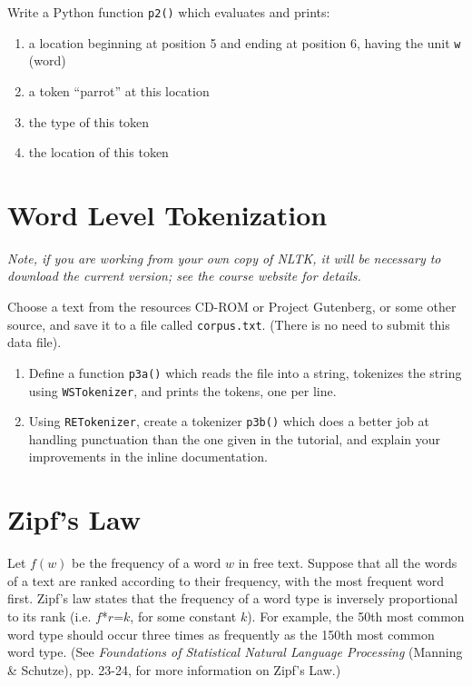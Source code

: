 \documentclass{cis530}
\begin{document}
Write a Python function \texttt{p2()} which evaluates and prints:

\begin{enumerate}
    \item a location beginning at position 5 and ending at position 6,
      having the unit \texttt{w} (word)
    \item a token ``parrot'' at this location
    \item the type of this token
    \item the location of this token
\end{enumerate}

\section{Word Level Tokenization}

\textit{Note, if you are working from your own copy of NLTK, it will be
  necessary to download the current version; see the course website for
  details.}

Choose a text from the resources CD-ROM or Project Gutenberg, or some other
source, and save it to a file called \texttt{corpus.txt}.  (There is no need
to submit this data file).

\begin{enumerate}
    \item Define a function \texttt{p3a()} which reads the file into a
      string, tokenizes the string using \texttt{WSTokenizer},
      and prints the tokens, one per line.
    \item Using \texttt{RETokenizer}, create a tokenizer \texttt{p3b()}
      which does a better
      job at handling punctuation than the one given in the tutorial, and
      explain your improvements in the inline documentation.
\end{enumerate}

\section{Zipf's Law}

Let $f(w)$ be the frequency of a word $w$ in free text.  Suppose that
all the words of a text are ranked according to their frequency, with
the most frequent word first.
Zipf's law states that the frequency of a word type is inversely
proportional to its rank (i.e. $f$*$r$=$k$, for some constant $k$).
For example, the 50th most common word type should
occur three times as frequently as the 150th most common word type.
(See \emph{Foundations of Statistical Natural Language Processing}
(Manning \& Schutze), pp. 23-24, for more information on Zipf's Law.)
\end{document}
